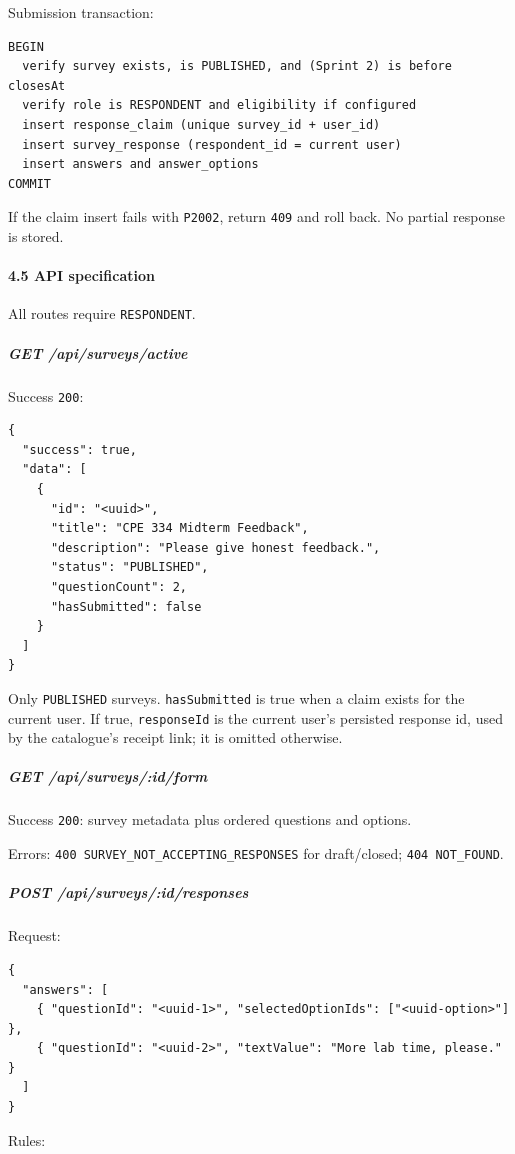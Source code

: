 \documentclass[12pt,a4paper]{article}
\begin{document}
Submission transaction:

\begin{lstlisting}
BEGIN
  verify survey exists, is PUBLISHED, and (Sprint 2) is before closesAt
  verify role is RESPONDENT and eligibility if configured
  insert response_claim (unique survey_id + user_id)
  insert survey_response (respondent_id = current user)
  insert answers and answer_options
COMMIT
\end{lstlisting}

If the claim insert fails with \texttt{P2002}, return \texttt{409} and roll back. No partial response is stored.

\paragraph*{4.5 API specification}
All routes require \texttt{RESPONDENT}.

\subparagraph*{GET /api/surveys/active}
Success \texttt{200}:

\begin{lstlisting}
{
  "success": true,
  "data": [
    {
      "id": "<uuid>",
      "title": "CPE 334 Midterm Feedback",
      "description": "Please give honest feedback.",
      "status": "PUBLISHED",
      "questionCount": 2,
      "hasSubmitted": false
    }
  ]
}
\end{lstlisting}

Only \texttt{PUBLISHED} surveys. \texttt{hasSubmitted} is true when a claim exists for the current user. If true, \texttt{responseId} is the current user's persisted response id, used by the catalogue's receipt link; it is omitted otherwise.

\subparagraph*{GET /api/surveys/:id/form}
Success \texttt{200}: survey metadata plus ordered questions and options.

Errors: \texttt{400 SURVEY\_NOT\_ACCEPTING\_RESPONSES} for draft/closed; \texttt{404 NOT\_FOUND}.

\subparagraph*{POST /api/surveys/:id/responses}
Request:

\begin{lstlisting}
{
  "answers": [
    { "questionId": "<uuid-1>", "selectedOptionIds": ["<uuid-option>"] },
    { "questionId": "<uuid-2>", "textValue": "More lab time, please." }
  ]
}
\end{lstlisting}

Rules:
\end{document}
